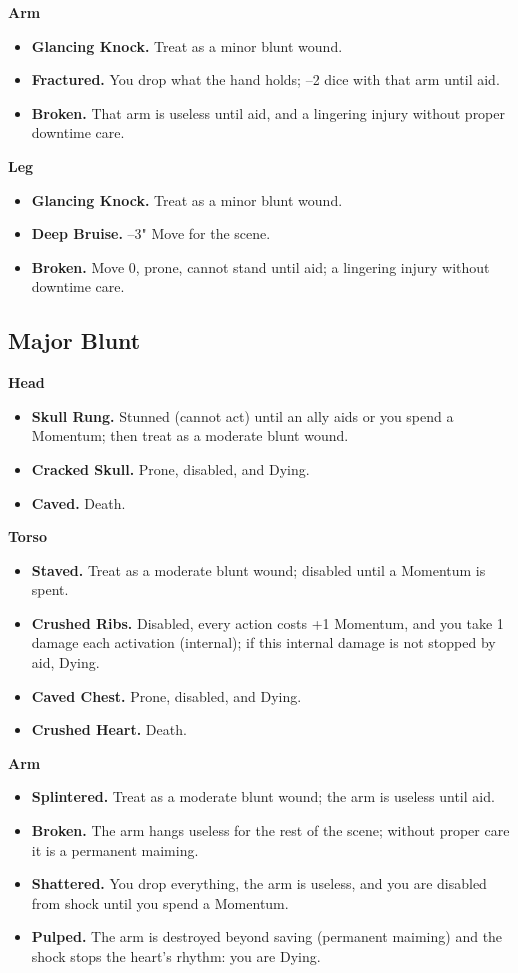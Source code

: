 \textbf{Arm}
\begin{itemize}
    \item[1] \textbf{Glancing Knock.} Treat as a minor blunt wound.
    \item[2] \textbf{Fractured.} You drop what the hand holds; --2 dice with that arm until aid.
    \item[3--4] \textbf{Broken.} That arm is useless until aid, and a lingering injury without proper downtime care.
\end{itemize}

\textbf{Leg}
\begin{itemize}
    \item[1] \textbf{Glancing Knock.} Treat as a minor blunt wound.
    \item[2] \textbf{Deep Bruise.} --3" Move for the scene.
    \item[3--4] \textbf{Broken.} Move 0, prone, cannot stand until aid; a lingering injury without downtime care.
\end{itemize}

\subsection{Major Blunt}

\textbf{Head}
\begin{itemize}
    \item[1] \textbf{Skull Rung.} Stunned (cannot act) until an ally aids or you spend a Momentum; then treat as a moderate blunt wound.
    \item[2] \textbf{Cracked Skull.} Prone, disabled, and Dying.
    \item[3--4] \textbf{Caved.} Death.
\end{itemize}

\textbf{Torso}
\begin{itemize}
    \item[1] \textbf{Staved.} Treat as a moderate blunt wound; disabled until a Momentum is spent.
    \item[2] \textbf{Crushed Ribs.} Disabled, every action costs +1 Momentum, and you take 1 damage each activation (internal); if this internal damage is not stopped by aid, Dying.
    \item[3] \textbf{Caved Chest.} Prone, disabled, and Dying.
    \item[4] \textbf{Crushed Heart.} Death.
\end{itemize}

\textbf{Arm}
\begin{itemize}
    \item[1] \textbf{Splintered.} Treat as a moderate blunt wound; the arm is useless until aid.
    \item[2] \textbf{Broken.} The arm hangs useless for the rest of the scene; without proper care it is a permanent maiming.
    \item[3] \textbf{Shattered.} You drop everything, the arm is useless, and you are disabled from shock until you spend a Momentum.
    \item[4] \textbf{Pulped.} The arm is destroyed beyond saving (permanent maiming) and the shock stops the heart's rhythm: you are Dying.
\end{itemize}

